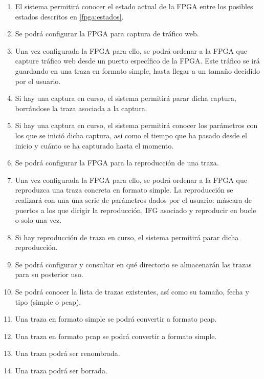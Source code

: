 \begin{enumerate}[before=\itshape,font=\normalfont,label=\bfseries RF. \arabic*]
  \item El sistema permitirá conocer el estado actual de la \gls{FPGA} entre los posibles estados descritos en \ref{fpga:estados}.
  \item Se podrá configurar la \gls{FPGA} para captura de tráfico web.
  \item Una vez configurada la \gls{FPGA} para ello, se podrá ordenar a la \gls{FPGA} que capture tráfico web desde un puerto específico de la \gls{FPGA}. Este tráfico se irá guardando en una \gls{traza} en formato \gls{simple}, hasta llegar a un tamaño decidido por el usuario.
  \item Si hay una captura en curso, el sistema permitirá parar dicha captura, borrándose la \gls{traza} asociada a la captura.
  \item Si hay una captura en curso, el sistema permitirá conocer los parámetros con los que se inició dicha captura, así como el tiempo que ha pasado desde el inicio y cuánto se ha capturado hasta el momento.
  \item Se podrá configurar la \gls{FPGA} para la reproducción de una \gls{traza}.
  \item Una vez configurada la \gls{FPGA} para ello, se podrá ordenar a la \gls{FPGA} que reproduzca una \gls{traza} concreta en formato \gls{simple}. La reproducción se realizará con una una serie de parámetros dados por el usuario: máscara de puertos a los que dirigir la reproducción, \gls{IFG} asociado y reproducir en bucle o solo una vez.
  \item Si hay reproducción de \gls{traza} en curso, el sistema permitirá parar dicha reproducción.
  \item Se podrá configurar y consultar en qué directorio se almacenarán las \glspl{traza} para su posterior uso.
  \item Se podrá conocer la lista de \glspl{traza} existentes, así como su tamaño, fecha y tipo (\gls{simple} o \gls{pcap}).
  \item Una traza en formato \gls{simple} se podrá convertir a formato \gls{pcap}.
  \item Una traza en formato \gls{pcap} se podrá convertir a formato \gls{simple}.
  \item Una \gls{traza} podrá ser renombrada.
  \item Una \gls{traza} podrá ser borrada.
\end{enumerate}

